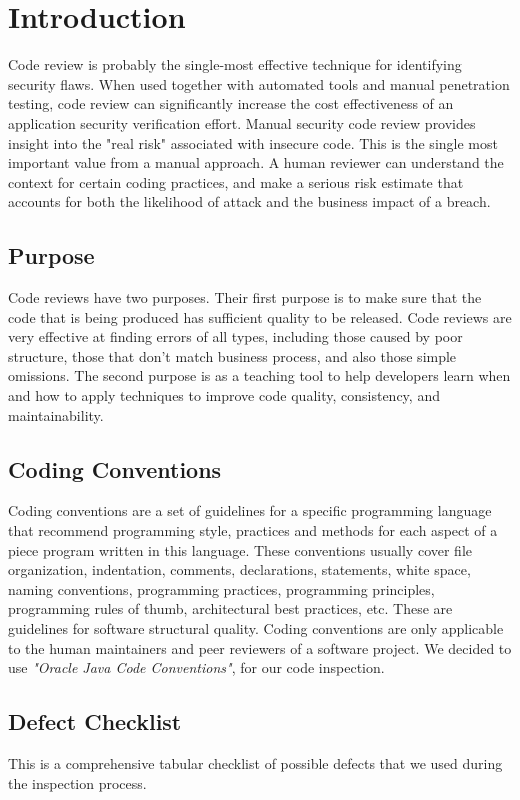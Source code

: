 \chapter{Introduction} \label{chap1}
Code review is probably the single-most effective technique for identifying security flaws. When used together with automated tools and manual penetration testing, code review can significantly increase the cost effectiveness of an application security verification effort.
Manual security code review provides insight into the "real risk" associated with insecure code. This is the single most important value from a manual approach. A human reviewer can understand the context for certain coding practices, and make a serious risk estimate that accounts for both the likelihood of attack and the business impact of a breach.

\section{Purpose}
Code reviews have two purposes. Their first purpose is to make sure that the code that is being produced has sufficient quality to be released. Code reviews are very effective at finding errors of all types, including those caused by poor structure, those that don't match business process, and also those simple omissions.
The second purpose is as a teaching tool to help developers learn when and how to apply techniques to improve code quality, consistency, and maintainability. 

\section{Coding Conventions}
Coding conventions are a set of guidelines for a specific programming language that recommend programming style, practices and methods for each aspect of a piece program written in this language. These conventions usually cover file organization, indentation, comments, declarations, statements, white space, naming conventions, programming practices, programming principles, programming rules of thumb, architectural best practices, etc. These are guidelines for software structural quality. Coding conventions are only applicable to the human maintainers and peer reviewers of a software project.
We decided to use \textit{"Oracle Java Code Conventions"}, for our code inspection.

\section{Defect Checklist}
This is a comprehensive tabular checklist of possible defects that we used during the inspection process.

